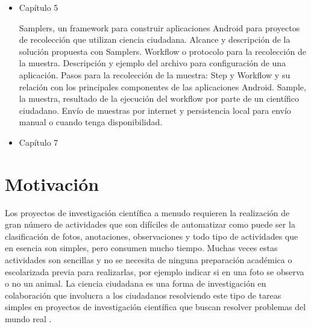 \begin{itemize}
	\item{Capítulo 5} 
		\begin{description} 
		Samplers, un framework para construir aplicaciones Android para proyectos de recolección que utilizan ciencia ciudadana. Alcance y descripción de la solución propuesta con Samplers. Workflow o protocolo para la recolección de la muestra. Descripción y ejemplo del archivo para configuración de una aplicación. Pasos para la recolección de la muestra: Step y Workflow y su relación con los principales componentes de las aplicaciones Android. Sample, la muestra, resultado de la ejecución del workflow por parte de un científico ciudadano. Envío de muestras por internet y persistencia local para envío manual o cuando tenga disponibilidad.
		\end{description}
		
	\item{Capítulo 7} 
		\begin{description} 
		\end{description}				
\end{itemize}

\section{ Motivación } \label{sec:motivacion}

Los proyectos de investigación científica a menudo requieren la realización de gran número de actividades que son difíciles de automatizar como puede ser la clasificación de fotos, anotaciones, observaciones y todo tipo de actividades que en esencia son simples, pero consumen mucho tiempo. Muchas veces estas actividades son sencillas y no se necesita de ninguna preparación académica o escolarizada previa para realizarlas, por ejemplo indicar si en una foto se observa o no un animal. La ciencia ciudadana es una forma de investigación en colaboración que involucra a los ciudadanos resolviendo este tipo de tareas simples en proyectos de investigación científica que buscan resolver problemas del mundo real \cite{wiggins2011conservation}. 

